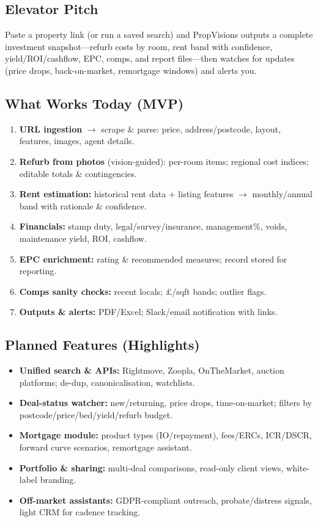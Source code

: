 \documentclass[12pt,a4paper]{article}
\begin{document}
\subsection{Elevator Pitch}
Paste a property link (or run a saved search) and PropVisions outputs a complete investment snapshot—refurb costs by room, rent band with confidence, yield/ROI/cashflow, EPC, comps, and report files—then watches for updates (price drops, back-on-market, remortgage windows) and alerts you.

\subsection{What Works Today (MVP)}
\begin{enumerate}[leftmargin=1.5em]
  \item \textbf{URL ingestion} $\rightarrow$ scrape \& parse: price, address/postcode, layout, features, images, agent details.
  \item \textbf{Refurb from photos} (vision-guided): per-room items; regional cost indices; editable totals \& contingencies.
  \item \textbf{Rent estimation:} historical rent data + listing features $\rightarrow$ monthly/annual band with rationale \& confidence.
  \item \textbf{Financials:} stamp duty, legal/survey/insurance, management\%, voids, maintenance \textrightarrow{} yield, ROI, cashflow.
  \item \textbf{EPC enrichment:} rating \& recommended measures; record stored for reporting.
  \item \textbf{Comps sanity checks:} recent locals; £/sqft bands; outlier flags.
  \item \textbf{Outputs \& alerts:} PDF/Excel; Slack/email notification with links.
\end{enumerate}

\subsection{Planned Features (Highlights)}
\begin{itemize}[leftmargin=1.5em]
  \item \textbf{Unified search \& APIs:} Rightmove, Zoopla, OnTheMarket, auction platforms; de-dup, canonicalisation, watchlists.
  \item \textbf{Deal-status watcher:} new/returning, price drops, time-on-market; filters by postcode/price/bed/yield/refurb budget.
  \item \textbf{Mortgage module:} product types (IO/repayment), fees/ERCs, ICR/DSCR, forward curve scenarios, remortgage assistant.
  \item \textbf{Portfolio \& sharing:} multi-deal comparisons, read-only client views, white-label branding.
  \item \textbf{Off-market assistants:} GDPR-compliant outreach, probate/distress signals, light CRM for cadence tracking.
\end{itemize}
\end{document}
